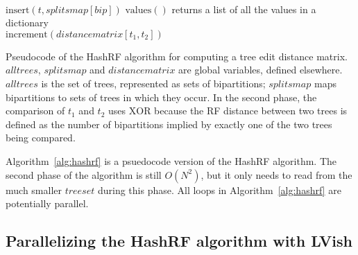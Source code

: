 \singlespacing
\begin{algorithm}
  \begin{algorithmic}[0] %
    \hspace{3em}\\
    \hspace{3em}$\mathrm{insert}(t, \mathit{splitsmap}[\mathit{bip}])$
    \EndFor
    \EndFor
     \Comment $\mathrm{values}()$ returns a list of all the values in a dictionary
    \Comment 
     \\
    \hspace{6em}$\mathrm{increment}(\mathit{distancematrix}[t_1, t_2])$
    \EndIf
    \EndFor
    \EndFor
    \EndFor
  \end{algorithmic} 
  \caption{Pseudocode of the HashRF algorithm for computing a tree
    edit distance matrix.  $\mathit{alltrees}$, $\mathit{splitsmap}$
    and $\mathit{distancematrix}$ are global variables, defined
    elsewhere.  $\mathit{alltrees}$ is the set of trees, represented
    as sets of bipartitions; $\mathit{splitsmap}$ maps bipartitions to
    sets of trees in which they occur.  In the second phase, the
    comparison of $t_1$ and $t_2$ uses $\mathrm{XOR}$ because the RF
    distance between two trees is defined as the number of
    bipartitions implied by exactly one of the two trees being
    compared.}
  \label{alg:hashrf}
\end{algorithm}
\doublespacing

\noindent Algorithm~\ref{alg:hashrf} is a psuedocode version of the
HashRF algorithm.  The second phase of the algorithm is still
$O(N^2)$, but it only needs to read from the much smaller
$\mathit{treeset}$ during this phase.  All loops in
Algorithm~\ref{alg:hashrf} are potentially parallel.

\subsection{Parallelizing the HashRF algorithm with LVish}

